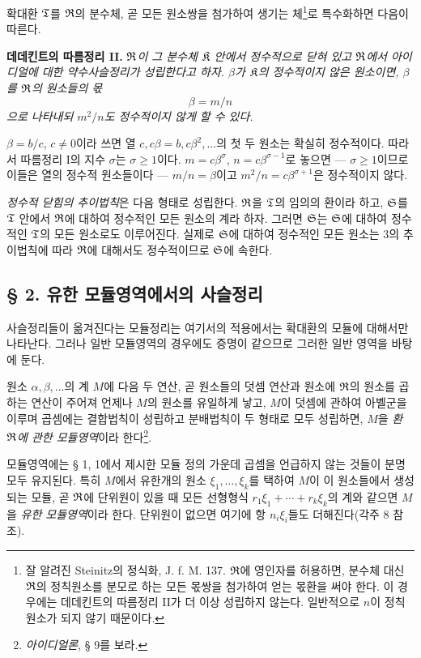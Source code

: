 확대환 \(\mathfrak{T}\)를 \(\mathfrak{R}\)의 분수체, 곧 모든 원소쌍을 첨가하여 생기는 체\footnote{잘 알려진 Steinitz의 정식화, J. f. M. 137. \(\mathfrak{R}\)에 영인자를 허용하면, 분수체 대신 \(\mathfrak{R}\)의 정칙원소를 분모로 하는 모든 몫쌍을 첨가하여 얻는 몫환을 써야 한다. 이 경우에는 데데킨트의 따름정리 II가 더 이상 성립하지 않는다. 일반적으로 \(n\)이 정칙원소가 되지 않기 때문이다.}로 특수화하면 다음이 따른다.

\medskip
\noindent\textbf{데데킨트의 따름정리 II.} \emph{\(\mathfrak{R}\)이 그 분수체 \(\mathfrak{K}\) 안에서 정수적으로 닫혀 있고 \(\mathfrak{R}\)에서 아이디얼에 대한 약수사슬정리가 성립한다고 하자. \(\beta\)가 \(\mathfrak{K}\)의 정수적이지 않은 원소이면, \(\beta\)를 \(\mathfrak{R}\)의 원소들의 몫
\[
        \beta=m/n
\]
으로 나타내되 \(m^2/n\)도 정수적이지 않게 할 수 있다.}

\(\beta=b/c\), \(c\ne0\)이라 쓰면 열 \(c,c\beta=b,c\beta^2,\ldots\)의 첫 두 원소는 확실히 정수적이다. 따라서 따름정리 I의 지수 \(\sigma\)는 \(\sigma\ge1\)이다. \(m=c\beta^\sigma\), \(n=c\beta^{\sigma-1}\)로 놓으면 --- \(\sigma\ge1\)이므로 이들은 열의 정수적 원소들이다 --- \(m/n=\beta\)이고 \(m^2/n=c\beta^{\sigma+1}\)은 정수적이지 않다.

\emph{정수적 닫힘의 추이법칙}은 다음 형태로 성립한다. \(\mathfrak{R}\)을 \(\mathfrak{T}\)의 임의의 환이라 하고, \(\mathfrak S\)를 \(\mathfrak{T}\) 안에서 \(\mathfrak{R}\)에 대하여 정수적인 모든 원소의 계라 하자. 그러면 \(\mathfrak S\)는 \(\mathfrak S\)에 대하여 정수적인 \(\mathfrak{T}\)의 모든 원소로도 이루어진다. 실제로 \(\mathfrak S\)에 대하여 정수적인 모든 원소는 3의 추이법칙에 따라 \(\mathfrak{R}\)에 대해서도 정수적이므로 \(\mathfrak S\)에 속한다.

\subsection*{§ 2. 유한 모듈영역에서의 사슬정리}

사슬정리들이 옮겨진다는 모듈정리는 여기서의 적용에서는 확대환의 모듈에 대해서만 나타난다. 그러나 일반 모듈영역의 경우에도 증명이 같으므로 그러한 일반 영역을 바탕에 둔다.

원소 \(\alpha,\beta,\ldots\)의 계 \(M\)에 다음 두 연산, 곧 원소들의 덧셈 연산과 원소에 \(\mathfrak{R}\)의 원소를 곱하는 연산이 주어져 언제나 \(M\)의 원소를 유일하게 낳고, \(M\)이 덧셈에 관하여 아벨군을 이루며 곱셈에는 결합법칙이 성립하고 분배법칙이 두 형태로 모두 성립하면, \(M\)을 \emph{환 \(\mathfrak{R}\)에 관한 모듈영역}이라 한다\footnote{\emph{아이디얼론}, § 9를 보라.}.

모듈영역에는 § 1, 1에서 제시한 모듈 정의 가운데 곱셈을 언급하지 않는 것들이 분명 모두 유지된다. 특히 \(M\)에서 유한개의 원소 \(\xi_1,\ldots,\xi_k\)를 택하여 \(M\)이 이 원소들에서 생성되는 모듈, 곧 \(\mathfrak{R}\)에 단위원이 있을 때 모든 선형형식 \(r_1\xi_1+\cdots+r_k\xi_k\)의 계와 같으면 \(M\)을 \emph{유한 모듈영역}이라 한다. 단위원이 없으면 여기에 항 \(n_i\xi_i\)들도 더해진다(각주 8 참조).

